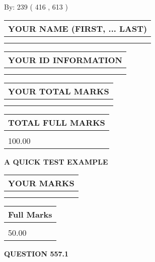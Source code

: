 \documentclass[12pt]{article}
\begin{document}
   
\hspace{1.0in} By: 
 239 ( 416 ,  613 )
   
   
   
   
\newpage 
\setcounter{page}{ 
   557001 } 
   
   
   
   
\noindent\begin{tabular}{|l|}
\hline
YOUR NAME (FIRST, ... LAST)  \\
\hline
 \\ 
 \\ 
\hline
\end{tabular}
\hspace{0.05in} \begin{tabular}{|l|}
\hline
 YOUR   ID   INFORMATION  \\
\hline
 \\ 
 \\ 
\hline
\end{tabular}
   
   
\vspace{0.2in}\noindent\begin{tabular}{|l|}
\hline
YOUR TOTAL MARKS  \\
\hline
 \\ 
 \\ 
\hline
\end{tabular}
\hspace{0.05in} \begin{tabular}{|l|}
\hline
TOTAL FULL MARKS  \\
\hline
 \\ 
100.00 \\
\hline
\end{tabular}
   
   
 \vspace{0.2in}
{\LARGE {\textbf{ A QUICK TEST EXAMPLE}}}
   
   
  
\vspace{0.2in}
  
\noindent\begin{tabular}{|l|}
\hline
 YOUR MARKS  \\
\hline
 \\ 
 \\ 
\hline
\end{tabular}
\hspace{0.05in} \begin{tabular}{|l|}
\hline
 Full Marks  \\
\hline
 \\ 
50.00 \\
\hline
\end{tabular}
{\textbf{\Large{QUESTION
557.1 
}}}
  
\end{document}
